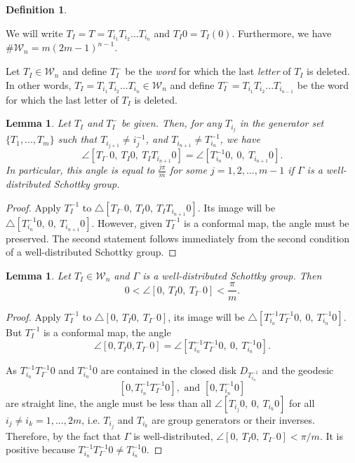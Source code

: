 \documentclass[12pt,oneside]{sfsuthesis}
\theoremstyle{plain} %
\newtheorem{lemma}[theorem]{Lemma}
\theoremstyle{definition}  %
\newtheorem{definition}{Definition}[chapter]
\theoremstyle{remark}  %
\theoremstyle{plain}
\begin{document}
{\begin{definition}
\end{definition}



We will write $T_I =  T = T_{i_1}T_{i_2}...T_{i_n}$ and $T_I 0  = T_I(0)$. Furthermore, we have $\#{\mathcal W}_n = m  (2m-1)^{n-1}$.




Let $T_I\in{\mathcal W}_n$ and define $T_I^{-}$  be the \textit{word} for which the last \textit{letter} of $T_I$ is deleted. In other words, $T_I=T_{i_1}T_{i_2}...T_{i_n}\in{\mathcal W}_n$ and define $T_I^{-}=T_{i_1}T_{i_2}...T_{i_{n-1}}$ be the word for which the last letter of $T_I$ is deleted.



\begin{lemma}\label{lemma1}
Let $T_I$ and $T_I^{-}$ be given. Then, for any $T_{i_j}$ in the generator set $\{T_1,...,T_m\}$ such that $T_{i_{j+1}}\ne i_{j}^{-1}$, and $T_{i_{n+1}}\neq T_{i_{n}}^{-1}$, we have
$$
\angle  [T_{I^{-}}0, \ T_I0, \ T_{I}T_{i_{n+1}}0] = \angle [T_{i_{n}}^{-1}0, \ 0, \ T_{i_{n+1}}0]. 
$$
In particular, this angle is equal to $\frac{j\pi}{m}$ for some $j =  1,2,...,m-1$ if $\Gamma$ is a well-distributed Schottky group. 
\end{lemma}

\begin{proof}
Apply $T_{I}^{-1}$ to $\bigtriangleup [T_{I^{-}}0, \ T_I0, \  T_{I}T_{i_{n+1}}0]$. Its image will be $\bigtriangleup [T_{i_{n}}^{-1}0, \ 0, \  T_{i_{n+1}}0]$. However, given $T_{I}^{-1}$ is a conformal map, the angle must be preserved. The second statement follows immediately from the second condition of a well-distributed Schottky group. 
\end{proof}

\begin{lemma}\label{lemma2}
Let $T_I\in{\mathcal W}_n$ and $\Gamma$ is a well-distributed Schottky group. Then 
$$ 
0<\angle [0,  \ T_I0,  \ T_{I^{-}}0] <\frac{\pi}{m}.
$$
\end{lemma}

\begin{proof}
Apply $T_{I}^{-1}$ to $\bigtriangleup[0,\ T_I0,   \ T_{I^{-}}0]$, its image will be $\bigtriangleup[ T_{i_n}^{-1} T_{I^{-}}^{-1}0, \  0, \  T_{i_n}^{-1}0]$. But $T_{I}^{-1}$ is a conformal  map, the angle 
$$
\angle [0, T_I0, T_{I^{-}}0]
 = \angle [T_{i_n}^{-1} T_{I^{-}}^{-1}0, \  0, \  T_{i_n}^{-1}0].
$$


As $T_{i_n}^{-1} T_{I^{-}}^{-1}0$ and $T_{i_n}^{-1}0$ are contained in the closed disk $D_{T_{i_n}^{-1}}$ and the geodesic $$[0,T_{i_{n}}^{-1} T_{I^{-}}^{-1}0 ], \text{ and }[0, T_{i_{n}}^{-1}0]$$ 
are straight line, the angle must be less than all $\angle [T_{i_j}0, \ 0, \  T_{i_k}0]$ for all $i_j \ne i_k = 1,...,2m$, i.e. $T_{i_j}$ and $T_{i_k}$ are group generators or their inverses. Therefore, by the fact that $\Gamma$ is well-distributed, $\angle [0, \ T_I0, \ T_{I^{-}}0] <\pi/m$. It is positive because $T_{i_n}^{-1} T_{I^{-}}^{-1}0\ne T_{i_n}^{-1}0$. 
\end{proof}


}
\end{document}
